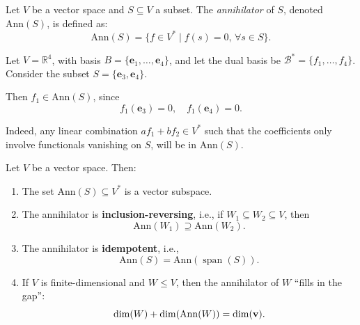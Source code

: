 \begin{definition}[Annihilator]\label{def:annihilator}
Let \( V \) be a vector space and \( S \subseteq V \) a subset. The \emph{annihilator} of \( S \), denoted \( \mathrm{Ann}(S) \), is defined as:
\[
\mathrm{Ann}(S) = \{ f \in V^* \mid f(s) = 0, \, \forall s \in S \}.
\]
\end{definition}

\begin{example}
Let \( V = \mathbb{R}^4 \), with basis \( B = \{ \mathbf{e}_1, \dots, \mathbf{e}_4 \} \), and let the dual basis be \( \mathcal{B}^* = \{ f_1, \dots, f_4 \} \). Consider the subset \( S = \{ \mathbf{e}_3, \mathbf{e}_4 \} \).

Then \( f_1 \in \mathrm{Ann}(S) \), since
\[
f_1(\mathbf{e}_3) = 0, \quad f_1(\mathbf{e}_4) = 0.
\]

Indeed, any linear combination \( a f_1 + b f_2 \in V^* \) such that the coefficients only involve functionals vanishing on \( S \), will be in \( \mathrm{Ann}(S) \).
\end{example}

\begin{proposition}\label{prop:annihilator-properties}
Let \( V \) be a vector space. Then:
\begin{enumerate}
  \item The set \( \mathrm{Ann}(S) \subseteq V^* \) is a vector subspace.
  \item The annihilator is \textbf{inclusion-reversing}, i.e., if \( W_1 \subseteq W_2 \subseteq V \), then
  \[
  \mathrm{Ann}(W_1) \supseteq \mathrm{Ann}(W_2).
  \]
  \item The annihilator is \textbf{idempotent}, i.e.,
  \[
  \mathrm{Ann}(S) = \mathrm{Ann}(\operatorname{span}(S)).
  \]
  \item If \( V \) is finite-dimensional and \( W \leq V \), then the annihilator of \( W \) “fills in the gap”:
  \[
  \dim(W) + \dim(\mathrm{Ann}(W)) = \dim({\bf v}).
  \]
\end{enumerate}
\end{proposition}

